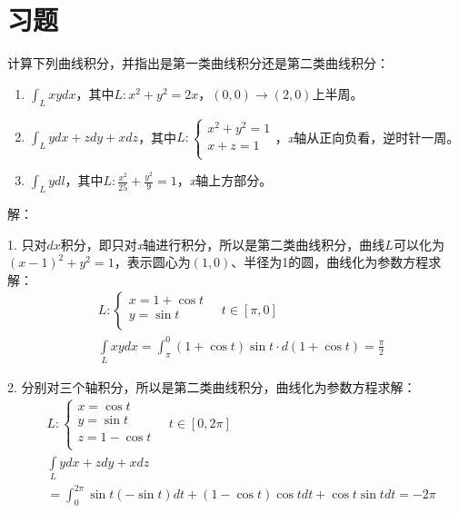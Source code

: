 \section{习题}

\begin{exercise}
计算下列曲线积分，并指出是第一类曲线积分还是第二类曲线积分：
\begin{enumerate}
    \item $\int_L{xydx}$，其中$L:x^2+y^2=2x$，$\left( 0,0 \right) \rightarrow \left( 2,0 \right) $上半周。
    \item $\int_L{ydx+zdy+xdz}$，其中$
    L:\begin{cases}
        x^2+y^2=1\\
        x+z=1\\
    \end{cases}
    $，{\it x}轴从正向负看，逆时针一周。
    \item $\int_L{ydl}$，其中$L:\frac{x^2}{25}+\frac{y^2}{9}=1$，{\it x}轴上方部分。
\end{enumerate}
\end{exercise}

解：

1. 只对$dx$积分，即只对{\it x}轴进行积分，所以是第二类曲线积分，曲线$L$可以化为$\left( x-1 \right) ^2+y^2=1$，表示圆心为$\left( 1,0 \right) $、半径为1的圆，曲线化为参数方程求解：
\begin{align*}
&L:\begin{cases}
	x=1+\cos t\\
	y=\sin t\\
\end{cases} \quad t\in \left[ \pi ,0 \right] \\
&\int\limits_L{xydx}=\int_{\pi}^0{\left( 1+\cos t \right) \sin t\cdot d\left( 1+\cos t \right)}=\frac{\pi}{2}
\end{align*}

2. 分别对三个轴积分，所以是第二类曲线积分，曲线化为参数方程求解：
\begin{align*}
&L:\begin{cases}
	x=\cos t\\
	y=\sin t\\
	z=1-\cos t\\
\end{cases} \quad t\in \left[ 0,2\pi \right] \\
&\int\limits_L{ydx+zdy+xdz} \\
&=\int_0^{2\pi}{\sin t\left( -\sin t \right) dt+\left( 1-\cos t \right) \cos tdt+\cos t\sin tdt}=-2\pi
\end{align*}

